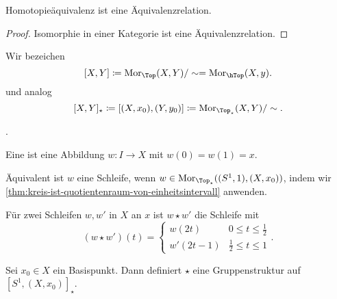 \begin{lemma}\label{lm:homotopieäquivalenz-ist-äquivalenzrelation}
Homotopieäquivalenz ist eine Äquivalenzrelation.    
\end{lemma}

\begin{proof}
    Isomorphie in einer Kategorie ist eine Äquivalenzrelation.
\end{proof}


\begin{notation}
    Wir bezeichen
    \[
        [X,Y] \coloneqq  \Mor_{\Top}(X,Y) / \sim = \Mor_{\hTop}(X,y)
    .\] 
    und analog
    \[
        [X,Y]_{\star} \coloneqq  [(X,x_0),(Y,y_0)] \coloneqq  \Mor_{\Top_{\star}}(X,Y) / \sim 
    .\] 
\end{notation}
.

\begin{definition}[Schleife]\label{def:schleife}
    Eine  ist eine Abbildung $w\colon  I \to  X$ mit $w(0) = w(1) = x$. 

    Äquivalent ist  $w$ eine Schleife, wenn  $w\in \Mor_{\Top_{\star}}((S^1,1), (X,x_0))$, indem wir \autoref{thm:kreis-ist-quotientenraum-von-einheitsintervall} anwenden.
\end{definition}


\begin{definition}\label{def:komposition-von-schleifen}
    Für zwei Schleifen $w,w'$ in  $X$ an  $x$ ist  $w \star w'$ die Schleife mit
     \[
         (w \star w')(t) = \begin{cases}
             w(2t) & 0\leq t\leq \frac{1}{2} \\
             w'(2t-1) & \frac{1}{2}\leq t\leq 1
         \end{cases}
    .\] 
\end{definition}

\begin{theorem}\label{thm:star-ist-gruppenstruktur}
    Sei $x_0\in X$ ein Basispunkt. Dann definiert $\star$ eine Gruppenstruktur auf  $[S^1,(X,x_0)]_{\star}$.
\end{theorem}

